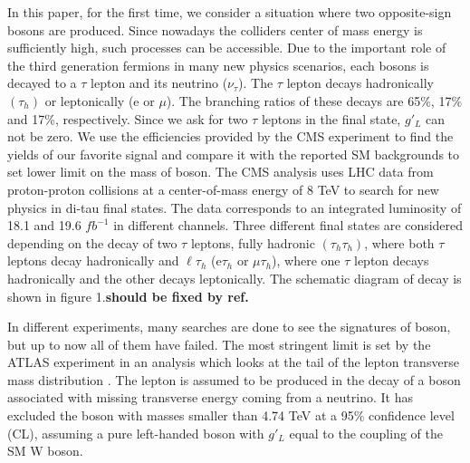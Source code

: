 In this paper, for the first time, we consider a situation where two opposite-sign \wprime bosons are produced. Since nowadays the colliders center of mass energy is sufficiently high, such processes can be accessible. Due to the important role of the third generation fermions in many new physics scenarios, each \wprime bosons is decayed to a $\tau$ lepton and its neutrino ($\nu_{\tau}$). The $\tau$ lepton decays hadronically $(\tau_h)$  or leptonically (e or $\mu$). The branching ratios of these decays are 65\%, 17\% and 17\%, respectively. Since we ask for two $\tau$ leptons in the final state, $g'_L$ can not be zero. 
We use the efficiencies provided by the CMS experiment \cite{Khachatryan:2016trj} to find the yields of our favorite signal and compare it with the reported SM backgrounds to set lower limit on the mass of \wprime boson. 
The CMS analysis uses LHC data from proton-proton collisions at a center-of-mass energy of 8 TeV to search for new physics in di-tau final states.  The data corresponds to an integrated luminosity of 18.1 and 19.6 $fb^{-1}$ in different channels. Three different final states are considered depending on the decay of two $\tau$ leptons, fully hadronic $(\tau_h \tau_h)$, where both $\tau$ leptons decay hadronically and $\ell\tau_h$ (e$\tau_h$ or $\mu\tau_h$), where one $\tau$ lepton decays hadronically and the other decays leptonically. The schematic diagram of decay is shown in figure 1.{\bf should be fixed by ref.}

In different experiments, many searches are done to see the signatures of \wprime boson, but up to now all of them have failed. The most stringent limit is set by the ATLAS experiment in an analysis which looks at the tail of the lepton transverse mass distribution \cite{ATLAS:2016ecs}. The lepton is assumed to be produced in the decay of a \wprime boson associated with missing transverse energy coming from a neutrino. It has excluded the \wprime boson with masses smaller than 4.74 TeV at a 95\% confidence level (CL), assuming a pure left-handed \wprime boson with $g'_L$ equal to the coupling of the SM W boson. 